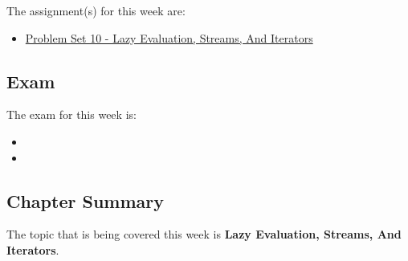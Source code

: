 The assignment(s) for this week are:

\begin{itemize}
    \item \href{https://github.com/QuantumCompiler/CU/tree/main/CSPB%203155%20-%20Principles%20Of%20Programming%20Languages/Assignments/Problem%20Sets/Problem%20Set%2010%20-%20Lazy%20Evaluation%2C%20Streams%2C%20And%20Iterators}{Problem Set 10 - Lazy Evaluation, Streams, And Iterators}
\end{itemize}

\subsection{Exam}

The exam for this week is:

\begin{itemize}
    \item {}
    \item {}
\end{itemize}

\newpage

\subsection{Chapter Summary}

The topic that is being covered this week is \textbf{Lazy Evaluation, Streams, And Iterators}.

